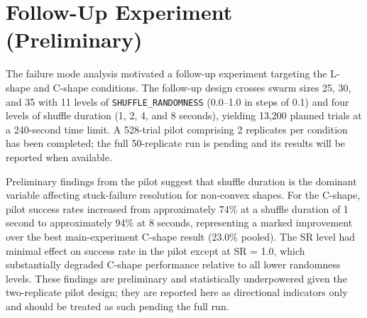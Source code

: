 \section{Follow-Up Experiment (Preliminary)}
\label{sec:results_followup}

The failure mode analysis motivated a follow-up experiment targeting the L-shape and C-shape conditions. The follow-up design crosses swarm sizes 25, 30, and 35 with 11 levels of \texttt{SHUFFLE\_RANDOMNESS} (0.0--1.0 in steps of 0.1) and four levels of shuffle duration (1, 2, 4, and 8 seconds), yielding 13,200 planned trials at a 240-second time limit. A 528-trial pilot comprising 2 replicates per condition has been completed; the full 50-replicate run is pending and its results will be reported when available.

Preliminary findings from the pilot suggest that shuffle duration is the dominant variable affecting stuck-failure resolution for non-convex shapes. For the C-shape, pilot success rates increased from approximately 74\% at a shuffle duration of 1 second to approximately 94\% at 8 seconds, representing a marked improvement over the best main-experiment C-shape result (23.0\% pooled). The SR level had minimal effect on success rate in the pilot except at SR = 1.0, which substantially degraded C-shape performance relative to all lower randomness levels. These findings are preliminary and statistically underpowered given the two-replicate pilot design; they are reported here as directional indicators only and should be treated as such pending the full run.
